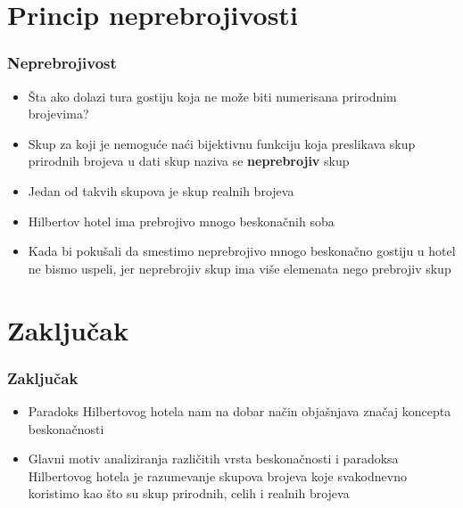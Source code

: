 \documentclass{beamer}
\begin{document}
\section{Princip neprebrojivosti}
\begin{frame}[fragile]\frametitle{Neprebrojivost}
\begin{itemize}
 \item Šta ako dolazi tura gostiju koja ne može biti numerisana prirodnim brojevima?
    \item Skup za koji je nemoguće naći bijektivnu funkciju koja preslikava skup prirodnih brojeva u dati skup naziva se \textbf{neprebrojiv} skup
    \item Jedan od takvih skupova je skup realnih brojeva
\end{itemize}
\begin{itemize}
    \item Hilbertov hotel ima prebrojivo mnogo beskonačnih soba
    \item Kada bi pokušali da smestimo neprebrojivo mnogo beskonačno gostiju u hotel ne bismo uspeli, jer neprebrojiv skup ima više elemenata nego prebrojiv skup
\end{itemize}
\end{frame}
\section{Zaključak}
\begin{frame}[fragile]\frametitle{Zaključak}
\begin{itemize}
 \item Paradoks Hilbertovog hotela nam na dobar način objašnjava značaj koncepta beskonačnosti
    \item Glavni motiv analiziranja različitih vrsta beskonačnosti i paradoksa Hilbertovog hotela je razumevanje
    skupova brojeva koje svakodnevno koristimo kao što su skup prirodnih, celih i realnih brojeva
\end{itemize}
\end{frame}
\end{document}
